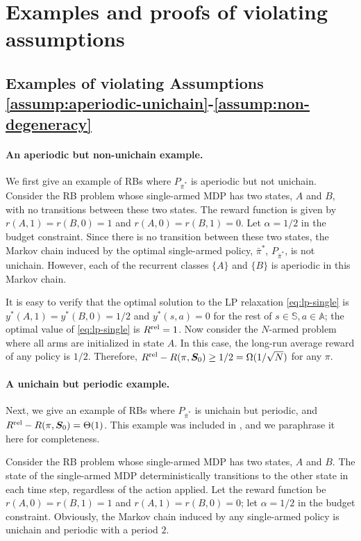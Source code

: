 \documentclass[11pt,letterpaper]{article}
\theoremstyle{plain}
\theoremstyle{definition}
\theoremstyle{remark}
\newcommand{\ve}[1]{\bm{#1}}
\newcommand{\veS}{\ve{S}}
\newcommand{\sspa}{\mathbb{S}}
\newcommand{\aspa}{\mathbb{A}}
\newcommand{\rel}{\textup{rel}} %
\newcommand{\ravg}{R}
\newcommand{\rsysn}{\ravg(\pi, \veS_0)}
\newcommand{\rrel}{\ravg^\rel}
\newcommand{\pibar}{{\sysbar{\pi}}}
\newcommand{\pibs}{{\pibar^*}}
\newcommand{\sysbar}[1]{\bar{#1}}
\begin{document}




\section{Examples and proofs of violating assumptions}
\label{sec:proof-discuss-assumptions}

\subsection{Examples of violating Assumptions \ref{assump:aperiodic-unichain}-\ref{assump:non-degeneracy}} \label{app:examples_vio_assump}

\paragraph{An aperiodic but non-unichain example.}
We first give an example of RBs where $P_\pibs$ is aperiodic but not unichain. 
Consider the RB problem whose single-armed MDP has two states, $A$ and $B$, with no transitions between these two states. 
The reward function is given by $r(A, 1) = r(B, 0) = 1$ and $r(A, 0) = r(B, 1) = 0$.  
Let $\alpha = 1/2$ in the budget constraint. 
Since there is no transition between these two states, the Markov chain induced by the optimal single-armed policy, $\pibs$, $P_\pibs$, is not unichain. However, each of the recurrent classes $\{A\}$ and $\{B\}$ is aperiodic in this Markov chain. 

It is easy to verify that the optimal solution to the LP relaxation \eqref{eq:lp-single} is  $y^*(A,1) = y^*(B, 0) = 1/2$ and $y^*(s,a) = 0$ for the rest of $s\in\sspa, a\in\aspa$; the optimal value of  \eqref{eq:lp-single} is $\rrel = 1$. 
Now consider the $N$-armed problem where all arms are initialized in state $A$. In this case, the long-run average reward of any policy is $1/2$. Therefore, $\rrel - \rsysn \geq 1/2 = \Omega(1/\sqrt{N})$ for any $\pi$. 



\paragraph{A unichain but periodic example.}
Next, we give an example of RBs where  $P_\pibs$ is unichain but periodic, and $\rrel - \rsysn = \Theta(1)$. This example was included in \cite{HonXieCheWan_24}, and we paraphrase it here for completeness. 

Consider the RB problem whose single-armed MDP has two states, $A$ and $B$. 
The state of the single-armed MDP deterministically transitions to the other state in each time step, regardless of the action applied. 
Let the reward function be $r(A,0)=r(B,1)=1$ and $r(A,1)=r(B,0)=0$; let $\alpha = 1/2$ in the budget constraint. 
Obviously, the Markov chain induced by any single-armed policy is unichain and periodic with a period $2$. 
\end{document}
